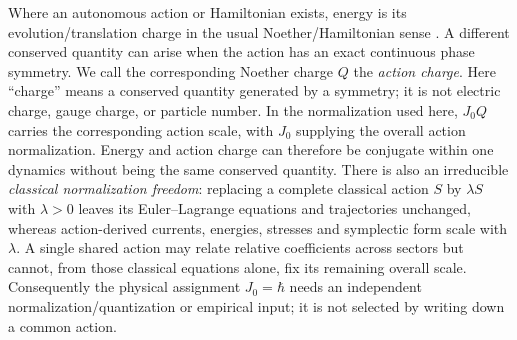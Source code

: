 \documentclass[11pt]{article}
\theoremstyle{definition}
\begin{document}
Where an autonomous action or Hamiltonian exists, energy is its evolution/translation
charge in the usual Noether/Hamiltonian sense \cite{Noether1918,PeskinSchroeder1995QFT}.
A different conserved quantity can arise when the action has an exact continuous phase
symmetry.  We call the corresponding Noether charge $Q$ the \emph{action charge}.
Here ``charge'' means a conserved quantity generated by a symmetry; it is not electric
charge, gauge charge, or particle number.  In the normalization used here, $J_0Q$
carries the corresponding action scale, with $J_0$ supplying the overall action
normalization.  Energy and action charge can therefore be conjugate within one dynamics
without being the same conserved quantity.  There is also an irreducible
\emph{classical normalization freedom}: replacing a complete classical action
$S$ by $\lambda S$ with $\lambda>0$ leaves its Euler--Lagrange equations and
trajectories unchanged, whereas action-derived currents, energies, stresses and
symplectic form scale with $\lambda$.  A single shared action may relate
relative coefficients across sectors but cannot, from those classical equations
alone, fix its remaining overall scale.  Consequently the physical assignment
$J_0=\hbar$ needs an independent normalization/quantization or empirical input;
it is not selected by writing down a common action.
\end{document}
